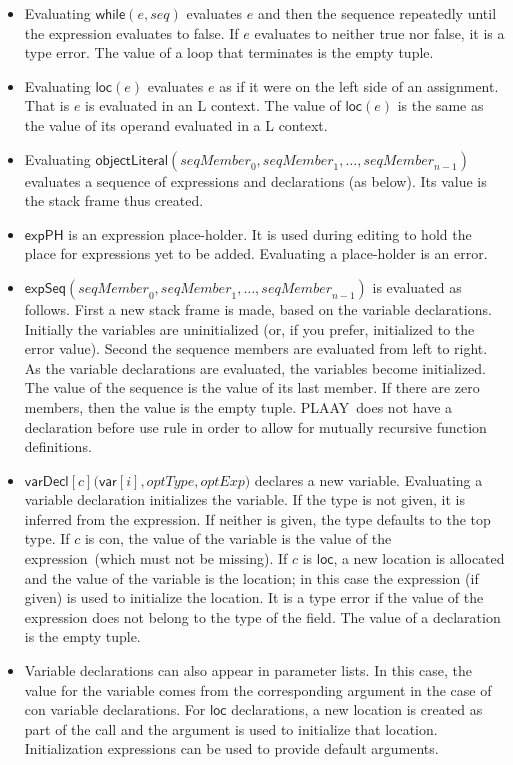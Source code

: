\documentclass[12pt]{article}
\begin{document}
\begin{itemize}
\item Evaluating $\mathsf{while}\left( e,\mathit{seq}\right) $ evaluates $e$
and then the sequence repeatedly until the expression evaluates to false. If 
$e$ evaluates to neither true nor false, it is a type error. The value of a
loop that terminates is the empty tuple.

\item Evaluating $\mathsf{loc}\left( e\right) $ evaluates $e$ as if it were
on the left side of an assignment. That is $e$ is evaluated in an L context.
The value of $\mathsf{loc}\left( e\right) $ is the same as the value of its
operand evaluated in a L context.

\item Evaluating $\mathsf{objectLiteral}\left( \mathit{seqMember}_{0},%
\mathit{seqMember}_{1},\ldots ,\mathit{seqMember}_{n-1}\right) $ evaluates a
sequence of expressions and declarations (as below). Its value is the stack
frame thus created.

\item $\mathsf{expPH}$ is an expression place-holder. It is used during
editing to hold the place for expressions yet to be added. Evaluating a
place-holder is an error.

\item $\mathsf{expSeq}\left( \mathit{seqMember}_{0},\mathit{seqMember}%
_{1},\ldots ,\mathit{seqMember}_{n-1}\right) $ is evaluated as follows.
First a new stack frame is made, based on the variable declarations.
Initially the variables are uninitialized (or, if you prefer, initialized to
the error value). Second the sequence members are evaluated from left to
right. As the variable declarations are evaluated, the variables become
initialized. The value of the sequence is the value of its last member. If
there are zero members, then the value is the empty tuple. PLAAY\ does not
have a declaration before use rule in order to allow for mutually recursive
function definitions.

\item $\mathsf{varDecl}[c]\mathsf{(var}[i],\mathit{optType,optExp})$
declares a new variable. Evaluating a variable declaration initializes the
variable. If the type is not given, it is inferred from the expression. If
neither is given, the type defaults to the top type. If $c$ is \textsf{con},
the value of the variable is the value of the expression\ (which must not be
missing). If $c$ is $\mathsf{loc}$, a new location is allocated and the
value of the variable is the location; in this case the expression (if
given) is used to initialize the location. It is a type error if the value
of the expression does not belong to the type of the field. The value of a
declaration is the empty tuple.

\item Variable declarations can also appear in parameter lists. In this
case, the value for the variable comes from the corresponding argument in
the case of \textsf{con} variable declarations. For $\mathsf{loc}$
declarations, a new location is created as part of the call and the argument
is used to initialize that location. Initialization expressions can be used
to provide default arguments.
\end{itemize}
\end{document}
